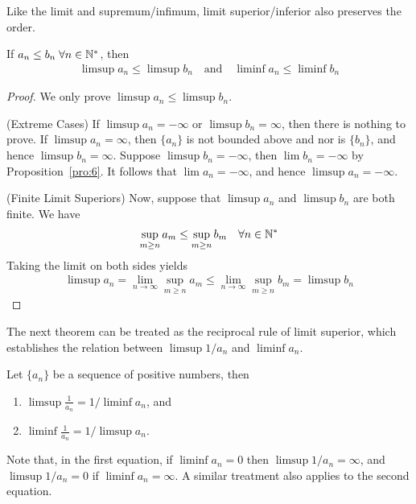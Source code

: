 \documentclass[thmcnt=section, 12pt]{my-elegantbook}
\begin{document}

Like the limit and supremum/infimum, limit superior/inferior also preserves the order.

\begin{theorem} \label{thm:59}
    If $a_n \leq b_n \; \forall n \in \mathbb{N}^\ast$, then
    \begin{align*}
        \limsup a_n \leq \limsup b_n
        \quad \text{and} \quad
        \liminf a_n \leq \liminf b_n
    \end{align*}
\end{theorem}

\begin{proof}
    We only prove $\limsup a_n \leq \limsup b_n$.

    (Extreme Cases) If $\limsup a_n = -\infty$ or $\limsup b_n = \infty$, then there is nothing to prove. If $\limsup a_n = \infty$, then $\{a_n\}$ is not bounded above and nor is $\{b_n\}$, and hence $\limsup b_n = \infty$. Suppose $\limsup b_n = -\infty$, then $\lim b_n = -\infty$ by Proposition~\ref{pro:6}. It follows that $\lim a_n = -\infty$, and hence $\limsup a_n = -\infty$.

    (Finite Limit Superiors) Now, suppose that $\limsup a_n$ and $\limsup b_n$ are both finite. We have
    \begin{align*}
        \sup_{m \geq n} a_m \leq \sup_{m \geq n} b_m
        \quad \forall n \in \mathbb{N}^\ast
    \end{align*}
    Taking the limit on both sides yields
    \begin{align*}
        \limsup a_n
        = \lim_{n \to \infty} \sup_{m \geq n} a_m
        \leq \lim_{n \to \infty} \sup_{m \geq n} b_m
        = \limsup b_n
    \end{align*}
\end{proof}


The next theorem can be treated as the reciprocal rule of limit superior, which establishes the relation between $\limsup 1 / a_n$ and $\liminf a_n$.

\begin{theorem} \label{thm:60}
    Let $\{a_n\}$ be a sequence of positive numbers, then
    \begin{enumerate}
        \item $\limsup \frac{1}{a_n} = 1 / \liminf a_n$, and
        \item $\liminf \frac{1}{a_n} = 1 / \limsup a_n$.
    \end{enumerate}
    Note that, in the first equation, if $\liminf a_n = 0$ then $\limsup 1 / a_n = \infty$, and $\limsup 1 / a_n = 0$ if $\liminf a_n = \infty$. A similar treatment also applies to the second equation.
\end{theorem}
\end{document}
